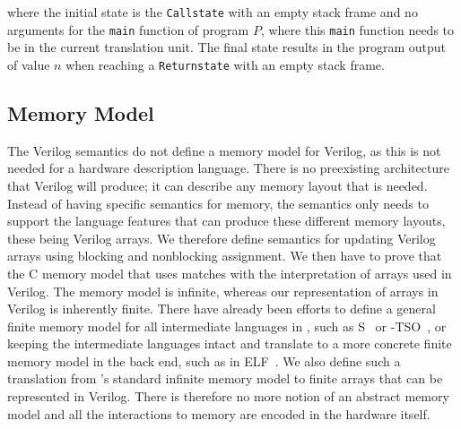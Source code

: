 
\noindent where the initial state is the \texttt{Callstate} with an empty stack
frame and no arguments for the \texttt{main} function of program $P$, where this
\texttt{main} function needs to be in the current translation unit.  The final
state results in the program output of value $n$ when reaching a
\texttt{Returnstate} with an empty stack frame.

\subsection{Memory Model}\label{sec:verilog:memory}

The Verilog semantics do not define a memory model for Verilog, as this is not
needed for a hardware description language.  There is no preexisting
architecture that Verilog will produce; it can describe any memory layout that
is needed.  Instead of having specific semantics for memory, the semantics only
needs to support the language features that can produce these different memory
layouts, these being Verilog arrays.  We therefore define semantics for updating
Verilog arrays using blocking and nonblocking assignment.  We then have to prove
that the C memory model that \compcert{} uses matches with the interpretation of
arrays used in Verilog.  The \compcert{} memory model is infinite, whereas our
representation of arrays in Verilog is inherently finite.  There have already
been efforts to define a general finite memory model for all intermediate
languages in \compcert{}, such as \compcert{}\-S~\cite{besson18_compc} or
\compcert{}-TSO~\cite{sevcik13_compc}, or keeping the intermediate languages
intact and translate to a more concrete finite memory model in the back end,
such as in \compcert{}\-ELF~\cite{wang20_compc}.  We also define such a
translation from \compcert{}'s standard infinite memory model to finite arrays
that can be represented in Verilog.  There is therefore no more notion of an
abstract memory model and all the interactions to memory are encoded in the
hardware itself.


